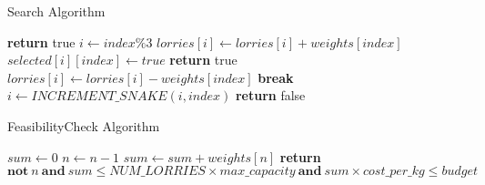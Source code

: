 \documentclass{article}
\begin{document}
\begin{algorithm}
	\caption{Search Algorithm}
	\label{algo:search}
	\begin{algorithmic}[1]
		\State \textbf{return} true
		\EndIf
            \State$i \gets index\%3$
		\State $lorries[i] \gets lorries[i] + weights[index]$
            \State $selected[i][index] \gets true$
		\State \textbf{return} true
		\EndIf
		\State $lorries[i] \gets lorries[i] - weights[index]$
		\EndIf
		\State \textbf{break}
		\EndIf
  \State$ i \gets INCREMENT\_SNAKE(i,index)$
		\EndFor
		\State \textbf{return} false
		\EndFunction
	\end{algorithmic}
\end{algorithm}
\begin{algorithm}
	\caption{FeasibilityCheck Algorithm}
	\label{algo:feasibilitycheck}
	\begin{algorithmic}[1]
		\State $sum \gets 0$
            \State $n \gets n - 1$
            \State $sum \gets sum + weights[n]$
            \EndFor
		\State \textbf{return $\textbf{not} \ n \ \textbf{and} \  sum \leq NUM\_LORRIES \times max\_capacity \ \textbf{and} \   sum \times cost\_per\_kg \leq budget $}
		\EndFunction
	\end{algorithmic}
\end{algorithm}
\end{document}
